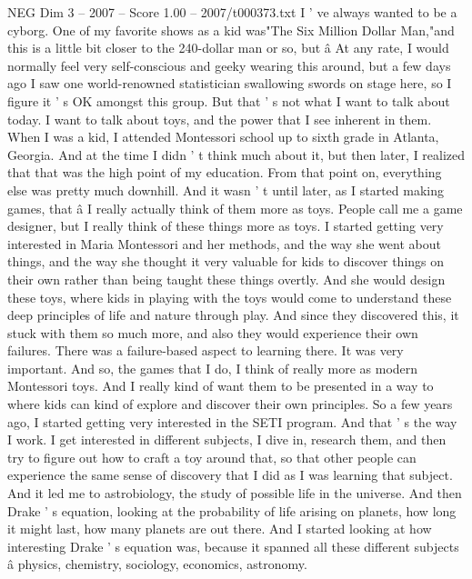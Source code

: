 \begin{textsample}{NEG Dim 3 – 2007 – Score 1.00 – 2007/t000373.txt}  \label{ex:f3_neg_042}
I ' ve always wanted to be a cyborg.
One of my favorite shows as a kid was"The Six Million Dollar Man,"and this is a little bit closer to the 240-dollar man or so, but â At any rate, I would normally feel very self-conscious and geeky wearing this around, but a few days ago I saw one world-renowned statistician swallowing swords on stage here, so I figure it ' s OK amongst this group.
But that ' s not what I want to talk about today.
I want to talk about toys, and the power that I see inherent in them.
When I was a kid, I attended Montessori school up to sixth grade in Atlanta, Georgia.
And at the time I didn ' t think much about it, but then later, I realized that that was the high point of my education.
From that point on, everything else was pretty much downhill.
And it wasn ' t until later, as I started making games, that â I really actually think of them more as toys.
People call me a game designer, but I really think of these things more as toys.
I started getting very interested in Maria Montessori and her methods, and the way she went about things, and the way she thought it very valuable for kids to discover things on their own rather than being taught these things overtly.
And she would design these toys, where kids in playing with the toys would come to understand these deep principles of life and nature through play.
And since they discovered this, it stuck with them so much more, and also they would experience their own failures.
There was a failure-based aspect to learning there.
It was very important.
And so, the games that I do, I think of really more as modern Montessori toys.
And I really kind of want them to be presented in a way to where kids can kind of explore and discover their own principles.
So a few years ago, I started getting very interested in the SETI program.
And that ' s the way I work.
I get interested in different subjects, I dive in, research them, and then try to figure out how to craft a toy around that, so that other people can experience the same sense of discovery that I did as I was learning that subject.
And it led me to astrobiology, the study of possible life in the universe.
And then Drake ' s equation, looking at the probability of life arising on planets, how long it might last, how many planets are out there.
And I started looking at how interesting Drake ' s equation was, because it spanned all these different subjects â physics, chemistry, sociology, economics, astronomy.

\end{textsample}
